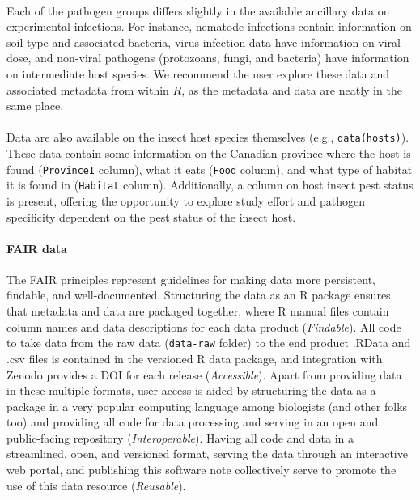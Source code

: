 \documentclass[12pt]{article}
\begin{document}
\paragraph*{}
Each of the pathogen groups differs slightly in the available ancillary data on experimental infections. For instance, nematode infections contain information on soil type and associated bacteria, virus infection data have information on viral dose, and non-viral pathogens (protozoans, fungi, and bacteria) have information on intermediate host species. We recommend the user explore these data and associated metadata from within $R$, as the metadata and data are neatly in the same place. 



\paragraph*{}
Data are also available on the insect host species themselves (e.g., \texttt{data(hosts)}). These data contain some information on the Canadian province where the host is found (\texttt{ProvinceI} column), what it eats (\texttt{Food} column), and what type of habitat it is found in (\texttt{Habitat} column). Additionally, a column on host insect pest status is present, offering the opportunity to explore study effort and pathogen specificity dependent on the pest status of the insect host. 




\paragraph*{FAIR data}
The FAIR principles represent guidelines for making data more persistent, findable, and well-documented. Structuring the data as an R package ensures that metadata and data are packaged together, where R manual files contain column names and data descriptions for each data product (\textit{Findable}). All code to take data from the raw data (\texttt{data-raw} folder) to the end product .RData and .csv files is contained in the versioned R data package, and integration with Zenodo provides a DOI for each release (\textit{Accessible}). Apart from providing data in these multiple formats, user access is aided by structuring the data as a package in a very popular computing language among biologists (and other folks too) and providing all code for data processing and serving in an open and public-facing repository (\textit{Interoperable}). Having all code and data in a streamlined, open, and versioned format, serving the data through an interactive web portal, and publishing this software note collectively serve to promote the use of this data resource (\textit{Reusable}).
\end{document}
